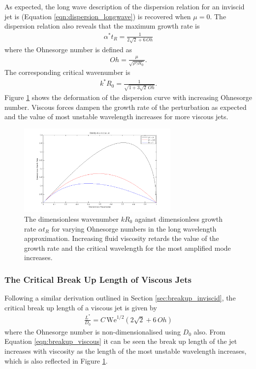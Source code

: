 \documentclass[11pt]{article}
\begin{document}
As expected, the long wave description of the dispersion relation for an inviscid jet is  (Equation \ref{eqn:dispersion_longwave}) is recovered when $\mu =0$. The dispersion relation also reveals that the maximum growth rate is 
\begin{align}
\alpha^*t_R = \frac{1}{2 \sqrt{2} + 6 \, Oh}
\label{eqn:visc_max_growth}
\end{align}
where the Ohnesorge number is defined as
\begin{align}
Oh = \frac{\mu}{\sqrt{\rho \gamma R_0}}.
\end{align}
The corresponding critical wavenumber is
\begin{align}
k^*R_0 = \frac{1}{\sqrt{1+ 3\sqrt{2} \, Oh}}.
\end{align}
Figure \ref{fig:dispersion_viscous} shows the deformation of the dispersion curve with increasing Ohnesorge number. Viscous forces dampen the growth rate of the perturbation as expected and the value of most unstable wavelength increases for more viscous jets.
\begin{figure}[ht]
\begin{center}
	\includegraphics[width = 0.7\textwidth]{img/dispersion_comparison_viscous.png}
	\caption{The dimensionless wavenumber $kR_0$ against dimensionless growth rate $\alpha t_R$ for varying Ohnesorge numbers in the long wavelength approximation. Increasing fluid viscosity retards the value of the growth rate and the critical wavelength for the most amplified mode increases.}
	\label{fig:dispersion_viscous}
\end{center}
\end{figure}

\subsubsection{The Critical Break Up Length of Viscous Jets} \label{sec:breakup_length}
Following a similar derivation outlined in Section \ref{sec:breakup_inviscid}, the critical break up length of a viscous jet is given by
\begin{align}
\frac{L^*}{D_0} = C \, \mathrm{We}^{1/2}(2 \sqrt{2} + 6 \, Oh)
\label{eqn:breakup_viscous}
\end{align}
where the Ohnesorge number is non-dimensionalised using $D_0$ also. From Equation \ref{eqn:breakup_viscous} it can be seen the break up length of the jet increases with viscosity as the length of the most unstable wavelength increases, which is also reflected in Figure \ref{fig:dispersion_viscous}.
\end{document}
